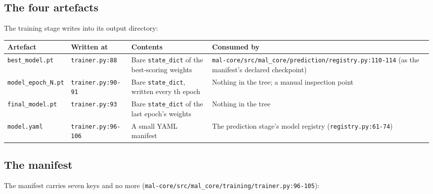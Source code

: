 \documentclass[11pt,a4paper]{article}
\newcommand{\codex}[1]{\texttt{#1}}
\newcommand{\CkptPeriod}{\codeconst{training.ckpt_period}}
\begin{document}
\subsection{The four artefacts}

The training stage writes into its output directory:

\begin{center}
\begin{longtable}{@{}lp{3.2cm}p{3.7cm}p{3.7cm}@{}}
\toprule
Artefact & Written at & Contents & Consumed by \\
\midrule
\endhead
\codex{best\_\allowbreak{}model.pt} & \codex{trainer.py:88} & Bare \codex{state\_\allowbreak{}dict} of the best-scoring weights & \codex{mal-core/\allowbreak{}src/\allowbreak{}mal\_\allowbreak{}core/\allowbreak{}prediction/\allowbreak{}registry.py:110-114} (as the manifest's declared checkpoint) \\
\codex{model\_\allowbreak{}epoch\_\allowbreak{}N.pt} & \codex{trainer.py:90-91} & Bare \codex{state\_\allowbreak{}dict}, written every \CkptPeriod{}th epoch & Nothing in the tree; a manual inspection point \\
\codex{final\_\allowbreak{}model.pt} & \codex{trainer.py:93} & Bare \codex{state\_\allowbreak{}dict} of the last epoch's weights & Nothing in the tree \\
\codex{model.yaml} & \codex{trainer.py:96-106} & A small YAML manifest & The prediction stage's model registry (\codex{registry.py:61-74}) \\
\bottomrule
\end{longtable}
\end{center}

\subsection{The manifest}

The manifest carries seven keys and no more
(\codex{mal-core/\allowbreak{}src/\allowbreak{}mal\_\allowbreak{}core/\allowbreak{}training/\allowbreak{}trainer.py:96-105}):
\end{document}
